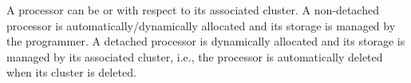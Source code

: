 \documentclass[openright,twoside]{report}
\begin{document}
%
%
%
%
%
%
A processor can be  or  with respect to its associated cluster.
A non-detached processor is automatically/dynamically allocated and its storage is managed by the programmer.
A detached processor is dynamically allocated and its storage is managed by its associated cluster, i.e., the processor is automatically deleted when its cluster is deleted.
\end{document}
